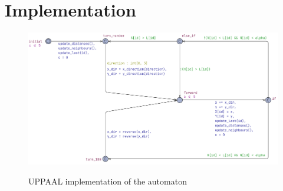 \section{Implementation}


\begin{figure}[h!]
\caption{UPPAAL implementation of the automaton}
\includegraphics[scale=0.3]{images/automaton_uppaal.png}
\label{fig:automata}
\end{figure}